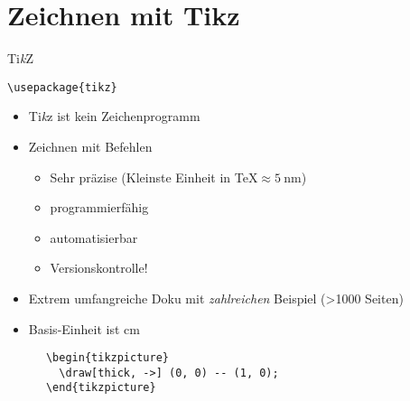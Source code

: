 \section{Zeichnen mit Tikz}

\begin{frame}[fragile]{%
  Ti\textit{k}Z
  \hfill
}
  \begin{Packages}
    \lstinline+\usepackage{tikz}+
  \end{Packages}
  \begin{itemize}
    \item \alert{T}i\textit{k}z \alert{i}st \alert{k}ein \alert{Z}eichenprogramm
    \item Zeichnen mit Befehlen
      \begin{itemize}
        \item Sehr präzise (Kleinste Einheit in \TeX ${} \approx \qty{5}{\nano\meter}$)
        \item programmierfähig
        \item automatisierbar
        \item Versionskontrolle!
      \end{itemize}
    \item Extrem umfangreiche Doku mit \emph{zahlreichen} Beispiel (>\num{1000} Seiten)
    \item Basis-Einheit ist \unit{\centi\meter}
  \end{itemize}
  \begin{CodeExample}{0.7}
    \begin{lstlisting}
      \begin{tikzpicture}
        \draw[thick, ->] (0, 0) -- (1, 0);
      \end{tikzpicture}
    \end{lstlisting}
  \CodeResult
  \strut\\
  \end{CodeExample}
\end{frame}
